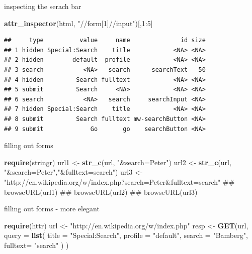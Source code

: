 \documentclass[ignorenonframetext,]{beamer}
\newenvironment{Shaded}{\begin{snugshade}}{\end{snugshade}}
\newcommand{\KeywordTok}[1]{\textcolor[rgb]{0.13,0.29,0.53}{\textbf{{#1}}}}
\newcommand{\DataTypeTok}[1]{\textcolor[rgb]{0.13,0.29,0.53}{{#1}}}
\newcommand{\DecValTok}[1]{\textcolor[rgb]{0.00,0.00,0.81}{{#1}}}
\newcommand{\StringTok}[1]{\textcolor[rgb]{0.31,0.60,0.02}{{#1}}}
\newcommand{\NormalTok}[1]{{#1}}
\begin{document}
\begin{frame}[fragile]{inspecting the serach bar}

\begin{Shaded}
\begin{Highlighting}[]
\KeywordTok{attr_inspector}\NormalTok{(html, }\StringTok{"//form[1]//input"}\NormalTok{)[,}\DecValTok{1}\NormalTok{:}\DecValTok{5}\NormalTok{]}
\end{Highlighting}
\end{Shaded}

\begin{verbatim}
##     type          value     name              id size
## 1 hidden Special:Search    title            <NA> <NA>
## 2 hidden        default  profile            <NA> <NA>
## 3 search           <NA>   search      searchText   50
## 4 hidden         Search fulltext            <NA> <NA>
## 5 submit         Search     <NA>            <NA> <NA>
## 6 search           <NA>   search     searchInput <NA>
## 7 hidden Special:Search    title            <NA> <NA>
## 8 submit         Search fulltext mw-searchButton <NA>
## 9 submit             Go       go    searchButton <NA>
\end{verbatim}

\end{frame}

\begin{frame}[fragile]{filling out forms}

\begin{Shaded}
\begin{Highlighting}[]
\KeywordTok{require}\NormalTok{(stringr)}
\NormalTok{url1 <-}\StringTok{ }\KeywordTok{str_c}\NormalTok{(url, }\StringTok{"&search=Peter"}\NormalTok{)}
\NormalTok{url2 <-}\StringTok{ }\KeywordTok{str_c}\NormalTok{(url, }\StringTok{"&search=Peter"}\NormalTok{,}\StringTok{"&fulltext=search"}\NormalTok{)}
\NormalTok{url3 <-}\StringTok{ "http://en.wikipedia.org/w/index.php?search=Peter&fulltext=search"}
\NormalTok{## browseURL(url1)}
\NormalTok{## browseURL(url2)}
\NormalTok{## browseURL(url3)}
\end{Highlighting}
\end{Shaded}

\end{frame}

\begin{frame}[fragile]{filling out forms - more elegant}

\begin{Shaded}
\begin{Highlighting}[]
\KeywordTok{require}\NormalTok{(httr)}
\NormalTok{url  <-}\StringTok{ "http://en.wikipedia.org/w/index.php"}
\NormalTok{resp <-}\StringTok{ }
\StringTok{  }\KeywordTok{GET}\NormalTok{(url, }
      \DataTypeTok{query =} \KeywordTok{list}\NormalTok{(}
        \DataTypeTok{title   =} \StringTok{"Special:Search"}\NormalTok{,}
        \DataTypeTok{profile =} \StringTok{"default"}\NormalTok{,}
        \DataTypeTok{search  =} \StringTok{"Bamberg"}\NormalTok{,}
        \DataTypeTok{fulltext=} \StringTok{"search"}
      \NormalTok{)}
  \NormalTok{)}
\end{Highlighting}
\end{Shaded}

\end{frame}
\end{document}
